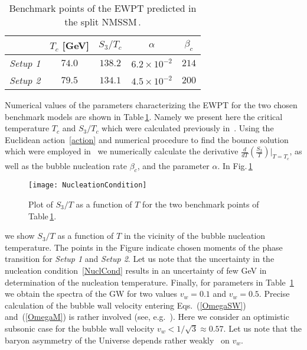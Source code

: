\documentclass[12pt]{article}
\begin{document}
\begin{table}[!htb]
\begin{center}
\begin{tabular}{|c|c|c|c|c|}
\hline
$ $ & $T_c$ [GeV] & $S_3/T_c$ & $ \alpha $ & $\beta_c$ \\
\hline
{\it Setup 1} & $ 74.0$ & $138.2$ & $6.2\times 10^{-2}$ & $214$ \\
\hline
{\it Setup 2} & $79.5$ & $ 134.1$ & $4.5\times 10^{-2}$ & $200$ \\
\hline
\end{tabular}
\end{center}
\caption{Benchmark points of the EWPT  predicted in 
 the split NMSSM\,\cite{Demidov:2016wcv}.
\label{TableOfSetup}}
\end{table}
Numerical values of the parameters characterizing the EWPT for the two chosen 
benchmark models are shown in Table\,\ref{TableOfSetup}.
Namely we
present here the critical temperature $T_c$ and $S_3/T_c$ which were 
calculated previously in~\cite{Demidov:2016wcv}. Using the Euclidean
action~\eqref{action} and numerical procedure to find the bounce
solution which were employed in~\cite{Demidov:2016wcv} we numerically
calculate the derivative
$\frac{d}{dT}\left(\frac{S_3}{T}\right)\Big|_{T=T_c}$,  
as well as the bubble nucleation rate $\beta_c$, and the
parameter $\alpha$. In Fig.\,\ref{figure2} 
\begin{figure}[!htb]
\begin{center}
\texttt{[image: NucleationCondition]}
\caption {Plot of  $S_3/T$ as a function of $T$ for the two benchmark
  points of Table\,\ref{TableOfSetup}.  
\label{figure2}}
\end{center}
\end{figure} 
we show 
$S_3/T$ as a function of $T$ in the vicinity of the bubble
  nucleation temperature. The points in the Figure indicate chosen 
  moments of the phase transition for {\it Setup 1} and {\it Setup
    2}.   Let us note that the uncertainty in the nucleation
  condition~\eqref{NuclCond} results in an uncertainty of few GeV in 
  determination of the nucleation temperature. Finally, for
  parameters in Table~\ref{TableOfSetup} we  
  obtain the spectra of the GW for two values $v_w=0.1$ and $v_w=0.5$.
Precise calculation of the
  bubble wall velocity entering Eqs.~(\ref{OmegaSW}) 
and~(\ref{OmegaM}) is rather involved (see,
e.g.~\cite{Huber:2011aa,Kozaczuk:2015owa}). 
Here we consider an optimistic subsonic
case for the bubble wall velocity $v_w < 1/\sqrt{3} \approx 0.57$.
Let us note that the baryon asymmetry of the Universe depends rather
weakly~\cite{Demidov:2016wcv} on $v_w$.
\end{document}

